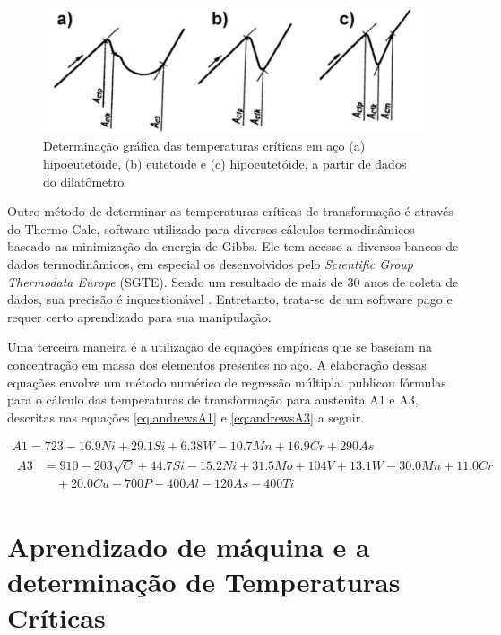 \documentclass[brazil,tese,epusp]{usp}
\begin{document}
\begin{figure}[ht!]
  \includegraphics[width=.9\textwidth]{img/dilatometer.png}
  \caption{Determinação gráfica das temperaturas críticas em aço (a) hipoeutetóide, (b) eutetoide e (c) hipoeutetóide, a partir de dados do dilatômetro \cite{Pawlowski2012}}
  \label{fig:dilatometer}
\end{figure}

Outro método de determinar as temperaturas críticas de transformação é através do Thermo-Calc\textregistered{}, software utilizado para diversos cálculos termodinâmicos baseado na minimização da energia de Gibbs. Ele tem acesso a diversos bancos de dados termodinâmicos, em especial os desenvolvidos pelo \textit{Scientific Group Thermodata Europe} (SGTE). Sendo um resultado de mais de 30 anos de coleta de dados, sua precisão é inquestionável \cite{TC2002}. Entretanto, trata-se de um software pago e requer certo aprendizado para sua manipulação.

Uma terceira maneira é a utilização de equações empíricas que se baseiam na concentração em massa dos elementos presentes no aço. A elaboração dessas equações envolve um método numérico de regressão múltipla.
   publicou fórmulas para o cálculo das temperaturas de transformação para austenita A1 e A3, descritas nas equações \ref{eq:andrewsA1} e \ref{eq:andrewsA3} a seguir.

\begin{align}
  A1 = 723 - 16.9 Ni + 29.1 Si + 6.38 W - 10.7 Mn + 16.9 Cr + 290 As \label{eq:andrewsA1}\\
  \begin{split}
  A3 &= 910 - 203 \sqrt{C}  + 44.7 Si - 15.2 Ni + 31.5 Mo + 104 V + 13.1 W - 30.0 Mn + 11.0 Cr \label{eq:andrewsA3}\\
  &\quad + 20.0 Cu - 700 P - 400 Al - 120 As - 400 Ti
  \end{split}
\end{align}

\section{Aprendizado de m\'aquina e a determinação de Temperaturas Cr\'iticas}
\end{document}
